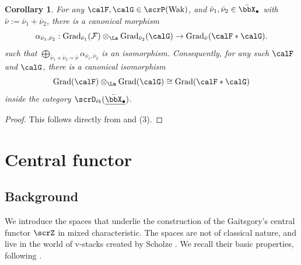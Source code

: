 \documentclass[10pt, reqno]{amsart}
\theoremstyle{plain}
\newtheorem{corollary}[theorem]{Corollary}
\theoremstyle{definition}
\numberwithin{equation}{section}
\begin{document}
	
	\begin{corollary}\label{prop_grad_monoidal}
		For any $\calF,
		\calG \in \scrP({\rm Wak})$, 
		and $\bar \nu_1,\bar \nu_2\in \bar\bbX_\bullet$ with $\bar\nu:=\bar\nu_1+\bar\nu_2$, there is a canonical morphism 
		\begin{equation}
			\alpha_{\bar\nu_1,\bar\nu_2}:\mathrm{Grad}_{\bar\nu_1}(\mathcal{F})\otimes_\La\mathrm{Grad}_{\bar\nu_2}(\calG)\rightarrow \mathrm{Grad}_{\bar\nu}(\calF*\calG).
		\end{equation}
		such that $\bigoplus_{\bar\nu_1+\bar\nu_2=\bar\nu}\alpha_{\bar\nu_1,\bar\nu_2}$ is an isomorphism. Consequently, for any such $\calF$ and $\calG$, there is a canonical isomorphism \begin{equation}\mathrm{Grad}(\calF)\otimes_\La \mathrm{Grad}(\calG)\cong \mathrm{Grad}(\calF*\calG)
		\end{equation}  inside the category $\scrD_{\mathrm{\acute{e}t}}(\underline{\bar\bbX_\bullet})$.
	\end{corollary}
	\begin{proof}
		This follows directly from    and   (3). 
	\end{proof}
	
	
	\section{Central functor}
	
	\subsection{Background}
	We introduce the spaces that underlie the construction of the Gaitsgory's central functor $\scrZ$ in mixed characteristic. The spaces are not of classical nature, and live in the world of v-stacks created by Scholze \cite{Sch17,SW20}. We recall their basic properties, following \cite{FS21,AGLR22}.  
	
\end{document}
